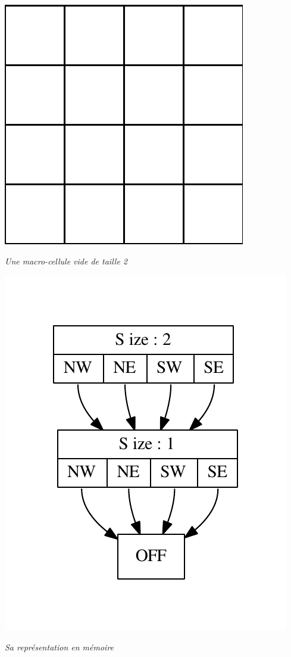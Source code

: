 \documentclass[a4paper,12pt]{report}
\begin{document}
\medskip
\begin{center}
    \includegraphics[scale=0.2]{emptycell.png}

    \textit{Une macro-cellule vide de taille 2}

    \medskip

    \includegraphics{empty2.pdf}

    \textit{Sa représentation en mémoire}
\end{center}
\end{document}
